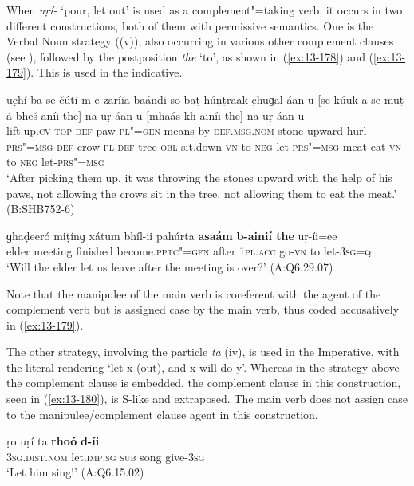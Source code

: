  When \textit{uṛí-} `pour, let out' is used as a complement"=taking verb, it occurs in two different constructions, both of them with permissive semantics. One is the Verbal Noun strategy ((v)), also occurring in various other complement clauses (see ), followed by the postposition \textit{the} `to', as shown in (\ref{ex:13-178}) and (\ref{ex:13-179}). This is used in the indicative.

\begin{exe}
\ex
\label{ex:13-178}
\gll uc̣hí ba se čúti-m-e zaríia baándi  so baṭ húṇṭraak c̣huɡal-áan-u [se kúuk-a se muṭ-á bheš-aníi the] na  uṛ-áan-u \textsc{[}mhaás
  kh-ainíi the] na uṛ-áan-u \\
lift.up.\textsc{cv} \textsc{top} \textsc{def} paw-\textsc{pl"=gen} means by  \textsc{def.msg.nom} stone upward hurl-\textsc{prs"=msg}  \textsc{def} crow-\textsc{pl} \textsc{def} tree-\textsc{obl} sit.down-\textsc{vn} to \textsc{neg} let-\textsc{prs"=msg} meat eat-\textsc{vn} to \textsc{neg} let-\textsc{prs"=msg} \\
\glt `After picking them up, it was throwing the stones upward with the help of his paws, not allowing the crows sit in the tree, not allowing them to eat the meat.' (B:SHB752-6)

\ex
\label{ex:13-179}
\gll ɡhaḍeeró miṭínɡ xátum bhíl-ii pahúrta \textbf{asaám} \textbf{ b-ainií the} uṛ-íi=ee \\
elder meeting finished become.\textsc{pptc"=gen} after \textsc{1pl.acc} go-\textsc{vn} to let-\textsc{3sg=q} \\
\glt `Will the elder let us leave after the meeting is over?' (A:Q6.29.07) 
\end{exe}

Note that the manipulee of the main verb is coreferent with the agent of the complement verb but is assigned case by the main verb, thus coded accusatively in (\ref{ex:13-179}).


The other strategy, involving the particle \textit{ta} (iv), is used in the Imperative, with the literal rendering `let x (out), and x will do y'. Whereas in the strategy above the complement clause is embedded, the complement clause in this construction, seen in (\ref{ex:13-180}), is S-like and extraposed. The main verb does not assign case to the manipulee/complement clause agent in this construction.

\begin{exe}
\ex
\label{ex:13-180}
\gll ṛo uṛí ta \textbf{rhoó} \textbf{d-íi} \\
\textsc{3sg.dist.nom} let.\textsc{imp.sg} \textsc{ sub} song give-\textsc{3sg} \\
\glt `Let him sing!' (A:Q6.15.02) 
\end{exe}

